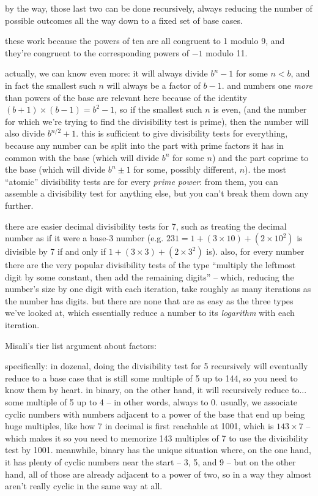 \documentclass[../footnotes.tex]{subfiles}
\begin{document}

\myfootnote{} by the way, those last two can be done recursively, always reducing the number of possible outcomes all the way down to a fixed set of base cases.

\myfootnote{} these work because the powers of ten are all congruent to 1 modulo 9, and they're congruent to the corresponding powers of $-1$ modulo 11.

\myfootnote{} actually, we can know even more: it will always divide $b^n - 1$ for some $n < b$, and in fact the smallest such $n$ will always be a factor of $b - 1$. and numbers one \emph{more} than powers of the base are relevant here because of the identity $(b + 1) \times (b - 1) = b^2 - 1$, so if the smallest such $n$ is even, (and the number for which we're trying to find the divisibility test is prime), then the number will also divide $b^{n/2} + 1$. this is sufficient to give divisibility tests for everything, because any number can be split into the part with prime factors it has in common with the base (which will divide $b^n$ for some $n$) and the part coprime to the base (which will divide $b^n \pm 1$ for some, possibly different, $n$). the most ``atomic'' divisibility tests are for every \emph{prime power}: from them, you can assemble a divisibility test for anything else, but you can't break them down any further.

\myfootnote{} there are easier decimal divisibility tests for 7, such as treating the decimal number as if it were a base-3 number (e.g. $231 = 1 + (3 \times 10) + (2 \times 10^2)$ is divisible by 7 if and only if $1 + (3 \times 3) + (2 \times 3^2)$ is). also, for every number there are the very popular divisibility tests of the type ``multiply the leftmost digit by some constant, then add the remaining digits'' -- which, reducing the number's size by one digit with each iteration, take roughly as many iterations as the number has digits. but there are none that are as easy as the three types we've looked at, which essentially reduce a number to its \emph{logarithm} with each iteration.

\myfootnote{} Misali's tier list argument about factors: \\

\myfootnote{} specifically: in dozenal, doing the divisibility test for 5 recursively will eventually reduce to a base case that is still some multiple of 5 up to 144, so you need to know them by heart. in binary, on the other hand, it will recursively reduce to... some multiple of 5 up to 4 -- in other words, always to 0. usually, we associate cyclic numbers with numbers adjacent to a power of the base that end up being huge multiples, like how 7 in decimal is first reachable at 1001, which is $143 \times 7$ -- which makes it so you need to memorize 143 multiples of 7 to use the divisibility test by 1001. meanwhile, binary has the unique situation where, on the one hand, it has plenty of cyclic numbers near the start -- 3, 5, and 9 -- but on the other hand, all of those are already adjacent to a power of two, so in a way they almost aren't really cyclic in the same way at all.
\end{document}
